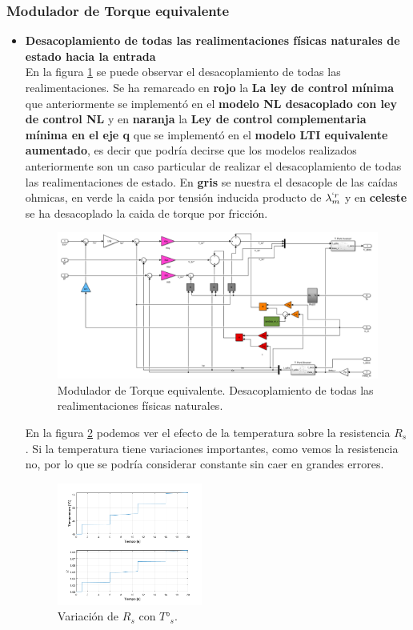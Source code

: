 \documentclass[10pt]{article}
\begin{document}
\subsubsection{Modulador de Torque equivalente}
\begin{itemize}
\item \textbf{Desacoplamiento de todas las realimentaciones físicas naturales de estado hacia la entrada}\\
	 En la figura \ref{fig:Tmodulador} se puede observar el desacoplamiento de todas las realimentaciones. Se ha remarcado en \textbf{rojo} la \textbf{La ley de control mínima} que anteriormente se implementó en el \textbf{modelo NL desacoplado con ley de control NL} y en \textbf{naranja} la \textbf{Ley de control complementaria mínima en el eje q}  que se implementó en el \textbf{modelo LTI equivalente aumentado}, es decir que podría decirse que los modelos realizados anteriormente son un caso particular de realizar el desacoplamiento de todas las realimentaciones de estado. En \textbf{gris} se nuestra el desacople de las caídas ohmicas, en verde la caida por tensión inducida producto de $\lambda^{`r}_{m}$ y en \textbf{celeste} se ha desacoplado la caida de torque por fricción.

	\begin{figure}[h!]
	\centering
	\includegraphics[width=\textwidth]{modulador de torque.png}
	\caption{\label{fig:Tmodulador}Modulador de Torque equivalente. Desacoplamiento de todas las realimentaciones físicas naturales.}
	\end{figure}
	
	En la figura \ref{fig:Ts} podemos ver el efecto de la temperatura sobre la resistencia $R_{s}$. Si la temperatura tiene variaciones importantes, como vemos la resistencia no, por lo que se podría considerar constante sin caer en grandes errores. 
	
	\begin{figure}[h!]
	\centering
	\includegraphics[width=0.45\textwidth]{Ts.png}
	\caption{\label{fig:Ts}Variación de $R_{s}$ con $T°_{s}$.}
	\end{figure}


\end{itemize}
\end{document}
